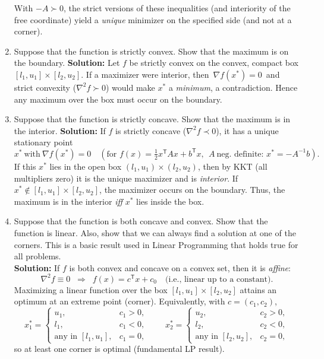 \documentclass[11pt]{article}
\begin{document}
\begin{enumerate}[label=2(\alph*)]
		With $-A\succ0$, the strict versions of these inequalities (and interiority of the free coordinate) yield a \emph{unique} minimizer on the specified side (and not at a corner).

		\item Suppose that the function is strictly convex. Show that the maximum is on the boundary.
		\textbf{Solution:}
		Let $f$ be strictly convex on the convex, compact box $[l_1,u_1]\times[l_2,u_2]$. 
		If a maximizer were interior, then $\,\nabla f(x^*)=0\,$ and strict convexity ($\nabla^2 f \succ 0$) would make $x^*$ a \emph{minimum}, a contradiction. 
		Hence any maximum over the box must occur on the boundary.

		\item Suppose that the function is strictly concave. Show that the maximum is in the interior.
		\textbf{Solution:}
		If $f$ is strictly concave ($\nabla^2 f \prec 0$), it has a unique stationary point
		\[
		x^* \ \text{with}\ \nabla f(x^*)=0
		\quad(\text{for } f(x)=\tfrac12 x^{\mathsf T}A x + b^{\mathsf T}x,\ \ A\ \text{neg.\ definite: } x^*=-A^{-1}b).
		\]
		If this $x^*$ lies in the open box $(l_1,u_1)\times(l_2,u_2)$, then by KKT (all multipliers zero) it is the unique maximizer and is \emph{interior}. 
		If $x^*\notin [l_1,u_1]\times[l_2,u_2]$, the maximizer occurs on the boundary. 
		Thus, the maximum is in the interior \emph{iff} $x^*$ lies inside the box.

		\item Suppose that the function is both concave and convex. Show that the function is linear. Also, show that we can always find a solution at one of the corners. This is a basic result used in Linear Programming that holds true for all problems.\\
		\textbf{Solution:}
		If $f$ is both convex and concave on a convex set, then it is \emph{affine}:
		\[
		\nabla^2 f \equiv 0 \;\;\Longrightarrow\;\; f(x)=c^{\mathsf T}x+c_0
		\quad\text{(i.e., linear up to a constant).}
		\]
		Maximizing a linear function over the box $[l_1,u_1]\times[l_2,u_2]$ attains an optimum at an extreme point (corner). 
		Equivalently, with $c=(c_1,c_2)$,
		\[
		x_1^*=\begin{cases}
			u_1,& c_1>0,\\
			l_1,& c_1<0,\\
			\text{any in }[l_1,u_1],& c_1=0,
		\end{cases}
		\qquad
		x_2^*=\begin{cases}
			u_2,& c_2>0,\\
			l_2,& c_2<0,\\
			\text{any in }[l_2,u_2],& c_2=0,
		\end{cases}
		\]
		so at least one corner is optimal (fundamental LP result).

	\end{enumerate}
	
\end{document}
